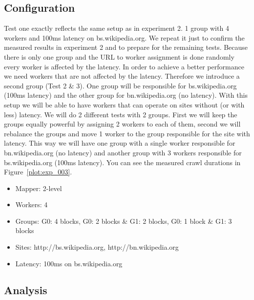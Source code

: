 \subsection{Configuration}
Test one exactly reflects the same setup as in experiment 2. 1 group with 4 workers and 100ms latency on bs.wikipedia.org. We repeat it just to confirm the measured results in experiment 2 and to prepare for the remaining tests. Because there is only one group and the URL to worker assignment is done randomly every worker is affected by the latency. In order to achieve a better performance we need workers that are not affected by the latency. Therefore we introduce a second group (Test 2 \& 3). One group will be responsible for bs.wikipedia.org (100ms latency) and the other group for bn.wikipedia.org (no latency). With this setup we will be able to have workers that can operate on sites without (or with less) latency. We will do 2 different tests with 2 groups. First we will keep the groups equally powerful by assigning 2 workers to each of them, second we will rebalance the groups and move 1 worker to the group responsible for the site with latency. This way we will have one group with a single worker responsible for bn.wikipedia.org (no latency) and another group with 3 workers responsible for bs.wikipedia.org (100ms latency). You can see the measured crawl durations in Figure~\ref{plot:exp_003}.
\begin{itemize}
  \item Mapper: 2-level
  \item Workers: 4
  \item Groups: G0: 4 blocks, G0: 2 blocks \& G1: 2 blocks, G0: 1 block \& G1: 3 blocks
  \item Sites: http://bs.wikipedia.org, http://bn.wikipedia.org
  \item Latency: 100ms on bs.wikipedia.org
\end{itemize}

\subsection{Analysis}

